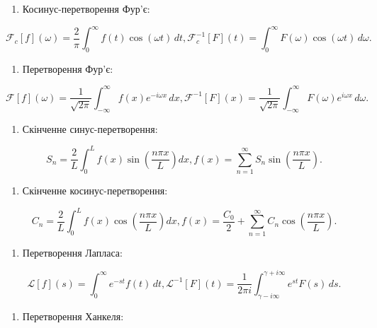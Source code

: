 \documentclass[
  ukrainian,
]{article}
\providecommand{\tightlist}{%
  \setlength{\itemsep}{0pt}\setlength{\parskip}{0pt}}
\begin{document}
\begin{enumerate}
\def\labelenumi{\arabic{enumi}.}
\setcounter{enumi}{1}
\tightlist
\item
  Косинус-перетворення Фур'є:
\end{enumerate}

\[
\mathcal{F}_c[f](\omega) = \frac{2}{\pi}\int_0^\infty f(t)\cos(\omega t)\,dt,
\mathcal{F}_c^{-1}[F](t) = \int_0^\infty F(\omega)\cos(\omega t)\,d\omega.
\]

\begin{enumerate}
\def\labelenumi{\arabic{enumi}.}
\setcounter{enumi}{2}
\tightlist
\item
  Перетворення Фур'є:
\end{enumerate}

\[
\mathcal{F}[f](\omega) = \frac{1}{\sqrt{2\pi}}\int_{-\infty}^{\infty} f(x)e^{-i\omega x}\,dx,
\mathcal{F}^{-1}[F](x) = \frac{1}{\sqrt{2\pi}}\int_{-\infty}^{\infty} F(\omega)e^{i\omega x}\,d\omega.
\]

\begin{enumerate}
\def\labelenumi{\arabic{enumi}.}
\setcounter{enumi}{3}
\tightlist
\item
  Скінченне синус-перетворення:
\end{enumerate}

\[
S_n = \frac{2}{L}\int_0^L f(x)\sin\!\left(\frac{n\pi x}{L}\right) dx,
f(x) = \sum_{n=1}^{\infty} S_n \sin\!\left(\frac{n\pi x}{L}\right).
\]

\begin{enumerate}
\def\labelenumi{\arabic{enumi}.}
\setcounter{enumi}{4}
\tightlist
\item
  Скінченне косинус-перетворення:
\end{enumerate}

\[
C_n = \frac{2}{L}\int_0^L f(x)\cos\!\left(\frac{n\pi x}{L}\right) dx,
f(x) = \frac{C_0}{2} + \sum_{n=1}^{\infty} C_n \cos\!\left(\frac{n\pi x}{L}\right).
\]

\begin{enumerate}
\def\labelenumi{\arabic{enumi}.}
\setcounter{enumi}{5}
\tightlist
\item
  Перетворення Лапласа:
\end{enumerate}

\[
\mathcal{L}[f](s) = \int_0^\infty e^{-st}f(t)\,dt,
\mathcal{L}^{-1}[F](t) = \frac{1}{2\pi i}\int_{\gamma-i\infty}^{\gamma+i\infty} e^{st}F(s)\,ds.
\]

\begin{enumerate}
\def\labelenumi{\arabic{enumi}.}
\setcounter{enumi}{6}
\tightlist
\item
  Перетворення Ханкеля:
\end{enumerate}
\end{document}
